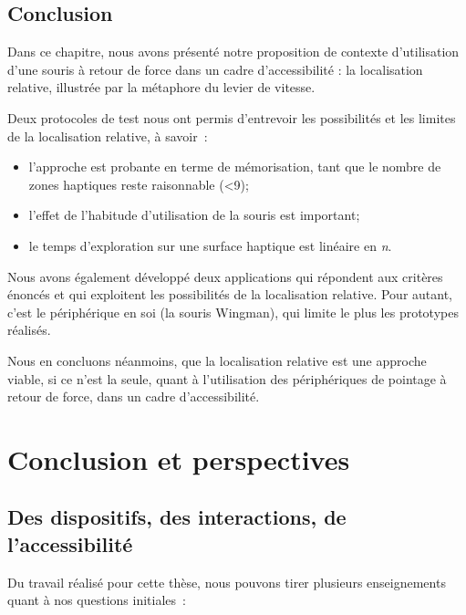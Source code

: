 \documentclass[
]{book}
\providecommand{\tightlist}{%
  \setlength{\itemsep}{0pt}\setlength{\parskip}{0pt}}
\begin{document}
\hypertarget{conclusion-5}{%
\section{Conclusion}\label{conclusion-5}}

Dans ce chapitre, nous avons présenté notre proposition de contexte
d'utilisation d'une souris à retour de force dans un cadre d'accessibilité :
la localisation relative, illustrée par la métaphore du levier de
vitesse.

Deux protocoles de test nous ont permis d'entrevoir les possibilités et
les limites de la localisation relative, à savoir~:

\begin{itemize}
\tightlist
\item
  l'approche est probante en terme de mémorisation,
  tant que le nombre de zones haptiques reste raisonnable (\textless9);
\item
  l'effet de l'habitude d'utilisation de la souris est
  important;
\item
  le temps d'exploration sur une surface haptique est
  linéaire en \emph{n}.
\end{itemize}

Nous avons également développé deux applications qui répondent aux
critères énoncés et qui exploitent les possibilités de la localisation
relative. Pour autant, c'est le périphérique en soi (la souris Wingman), qui
limite le plus les prototypes réalisés.

Nous en concluons néanmoins, que la localisation relative est une approche
viable, si ce n'est la seule, quant à l'utilisation des périphériques de
pointage à retour de force, dans un cadre d'accessibilité.

\hypertarget{conclusion-et-perspectives}{%
\chapter{Conclusion et perspectives}\label{conclusion-et-perspectives}}

\hypertarget{des-dispositifs-des-interactions-de-laccessibilituxe9}{%
\section{Des dispositifs, des interactions, de l'accessibilité}\label{des-dispositifs-des-interactions-de-laccessibilituxe9}}

Du travail réalisé pour cette thèse, nous pouvons tirer plusieurs
enseignements quant à nos questions initiales~:
\end{document}
